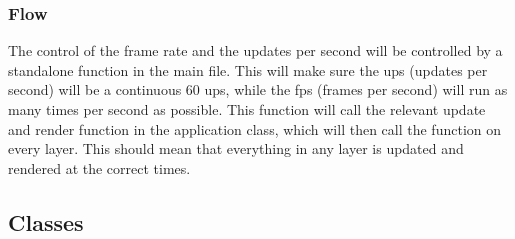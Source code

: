 \documentclass{article}
\begin{document}
            \subsubsection{Flow}
                The control of the frame rate and the updates per second will be controlled by a standalone function in the main file. This will make sure the ups (updates per second) will be a continuous 60 ups, while the fps (frames per second) will run as many times per second as possible. This function will call the relevant update and render function in the application class, which will then call the function on every layer. This should mean that everything in any layer is updated and rendered at the correct times.
        \clearpage
        \subsection{Classes}
\end{document}

